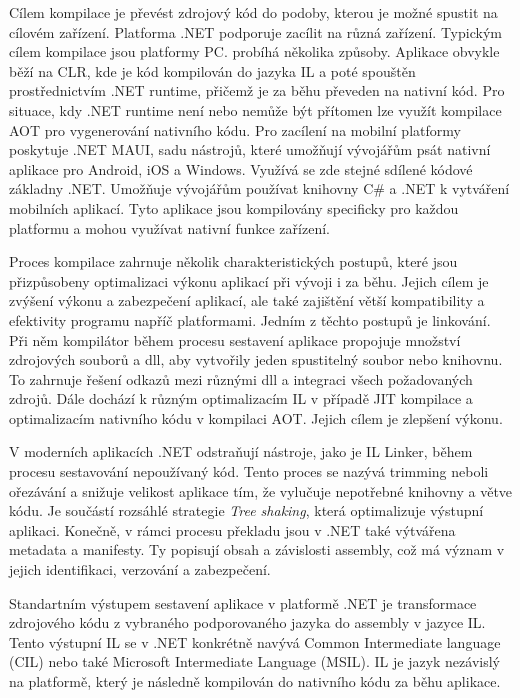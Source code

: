 
Cílem kompilace je převést zdrojový kód do podoby, kterou je možné spustit na cílovém zařízení. Platforma .NET podporuje zacílit na různá zařízení. Typickým cílem kompilace jsou platformy PC. probíhá několika způsoby. Aplikace obvykle běží na CLR, kde je kód kompilován do jazyka IL a poté spouštěn prostřednictvím .NET runtime, přičemž je za běhu převeden na nativní kód. Pro situace, kdy .NET runtime není nebo nemůže být přítomen lze využít kompilace AOT pro vygenerování nativního kódu. \cite{Pflug2023} Pro zacílení na mobilní platformy poskytuje .NET MAUI, sadu nástrojů, které umožňují vývojářům psát nativní aplikace pro Android, iOS a Windows. \cite{Libery2023} Využívá se zde stejné sdílené kódové základny .NET. Umožňuje vývojářům používat knihovny C\# a .NET k vytváření mobilních aplikací. Tyto aplikace jsou kompilovány specificky pro každou platformu a mohou využívat nativní funkce zařízení.


Proces kompilace zahrnuje několik charakteristických postupů, které jsou přizpůsobeny optimalizaci výkonu aplikací při vývoji i za běhu. Jejich cílem je zvýšení výkonu a zabezpečení aplikací, ale také zajištění větší kompatibility a efektivity programu napříč platformami. Jedním z těchto postupů je linkování. Při něm kompilátor během procesu sestavení aplikace propojuje množství zdrojových souborů a dll, aby vytvořily jeden spustitelný soubor nebo knihovnu. \cite{Bock2016}  To zahrnuje řešení odkazů mezi různými dll a integraci všech požadovaných zdrojů. Dále dochází k různým optimalizacím IL v případě JIT kompilace a optimalizacím nativního kódu v kompilaci AOT. Jejich cílem je zlepšení výkonu.

V moderních aplikacích .NET odstraňují nástroje, jako je IL Linker, během procesu sestavování nepoužívaný kód. Tento proces se nazývá trimming neboli ořezávání a snižuje velikost aplikace tím, že vylučuje nepotřebné knihovny a větve kódu. \cite{Price2023c8}  Je součástí rozsáhlé strategie \emph{Tree shaking}, která optimalizuje výstupní aplikaci. Konečně, v rámci procesu překladu jsou v .NET také výtvářena metadata a manifesty. Ty popisují obsah a závislosti assembly, což má význam v jejich identifikaci, verzování a zabezpečení. 


Standartním výstupem sestavení aplikace v platformě .NET je transformace zdrojového kódu z vybraného podporovaného jazyka do assembly v jazyce IL. Tento výstupní IL se v .NET konkrétně navývá Common Intermediate language (CIL) nebo také Microsoft Intermediate Language (MSIL). \cite{Richter2012} IL je jazyk nezávislý na platformě, který je následně kompilován do nativního kódu za běhu aplikace.

